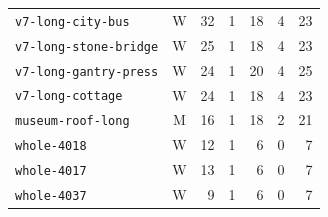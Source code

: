\begin{table}[!ht]
\begin{tabularx}{\textwidth}{@{}Xcrrrrr@{}}
\texttt{v7-long-city-bus} & W & 32 & 1 & 18 & 4 & 23\\
\texttt{v7-long-stone-bridge} & W & 25 & 1 & 18 & 4 & 23\\
\texttt{v7-long-gantry-press} & W & 24 & 1 & 20 & 4 & 25\\
\texttt{v7-long-cottage} & W & 24 & 1 & 18 & 4 & 23\\
\texttt{museum-roof-long} & M & 16 & 1 & 18 & 2 & 21\\
\texttt{whole-4018} & W & 12 & 1 & 6 & 0 & 7\\
\texttt{whole-4017} & W & 13 & 1 & 6 & 0 & 7\\
\texttt{whole-4037} & W & 9 & 1 & 6 & 0 & 7\\
\bottomrule
\end{tabularx}
\end{table}
